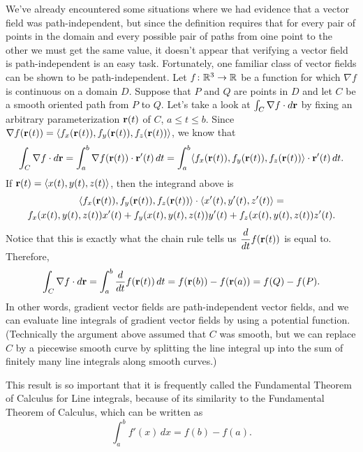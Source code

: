 We've already encountered some situations where we had evidence that a
vector field was path-independent, but since the definition requires
that for every pair of points in the domain and every possible pair of
paths from oine point to the other we must get the same value, it
doesn't appear that verifying a vector field is path-independent is an
easy task. Fortunately, one familiar class of vector fields can be
shown to be path-independent. Let $f\colon \mathbb{R}^3\to \mathbb{R}$ be a function
for which $\nabla f$ is continuous on a domain $D$. Suppose that $P$
and $Q$ are points in $D$ and let $C$ be a smooth oriented path from $P$ to
$Q$. Let's take a look at $\int_C\nabla f \cdot d\mathbf{r}$ by fixing an arbitrary
parameterization $\mathbf{r}(t)$ of $C$, $a\leq t \leq b$. Since $\nabla
f(\mathbf{r}(t)) = \langle f_x(\mathbf{r}(t)),f_y(\mathbf{r}(t)),f_z(\mathbf{r}(t))\rangle$, we know that
\[\int_C\nabla f\cdot d\mathbf{r}  = \int_a^b \nabla f(\mathbf{r}(t))\cdot
\mathbf{r}'(t)\, dt = \int_a^b \langle f_x(\mathbf{r}(t)), f_y(\mathbf{r}(t)),
f_z(\mathbf{r}(t))\rangle \cdot \mathbf{r}'(t)\, dt.\]
If $\mathbf{r}(t) = \langle x(t), y(t), z(t)\rangle$, then the integrand
above is
\begin{multline*}\langle f_x(\mathbf{r}(t)), f_y(\mathbf{r}(t)), f_z(\mathbf{r}(t))\rangle\cdot \langle
x'(t),y'(t),z'(t)\rangle =\\ f_x(x(t),y(t),z(t))x'(t) +
f_y(x(t),y(t),z(t))y'(t) + f_z(x(t),y(t),z(t))z'(t).\end{multline*}
Notice that this is exactly what the chain rule tells us
$\displaystyle\frac{d}{dt} f(\mathbf{r}(t))$ is equal to. Therefore,
\[\int_C\nabla f\cdot d\mathbf{r} = \int_a^b \frac{d}{dt} f(\mathbf{r}(t))\, dt =
f(\mathbf{r}(b)) - f(\mathbf{r}(a)) = f(Q) - f(P).\]
In other words, gradient vector fields are path-independent vector
fields, and we can evaluate line integrals of gradient vector fields
by using a potential function. (Technically the argument above assumed
that $C$ was smooth, but we can replace $C$ by a piecewise smooth
curve by splitting the line integral up into the sum of finitely many
line integrals along smooth curves.)

This result is so important that it is frequently called the
Fundamental Theorem of Calculus for Line integrals, because of its
similarity to the Fundamental Theorem of Calculus, which can be
written as
\[\int_a^b f'(x)\, dx = f(b) - f(a).\]
\vspace*{5pt}
\nin {} \vspace*{5pt}


